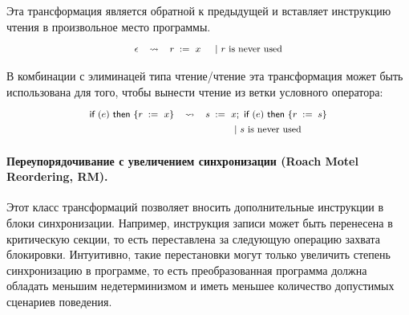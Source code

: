 Эта трансформация является обратной к предыдущей и вставляет инструкцию чтения в произвольное место программы.
%
\[\def\arraystretch{1.4}\footnotesize
  \begin{array}{cccl} 

      \epsInst
    & \leadsto 
    & \readInst{}{r}{x} 
    & ~|~ \text{$r$ is never used}  \\ 

  \end{array}
\]

В комбинации с элиминацей типа чтение/чтение 
эта трансформация может быть использована 
для того, чтобы вынести чтение из 
ветки условного оператора:
%
\[\def\arraystretch{1.4}\footnotesize
  \begin{array}{ccc} 

      \kw{if} (e)~ \kw{then} \{ \readInst{}{r}{x} \}
    & \leadsto 
    & \readInst{}{s}{x} \seq \kw{if} (e)~ \kw{then} \{ \assignInst{r}{s} \} \\
    & & ~|~ \text{$s$ is never used}  \\ 

  \end{array}
\]

\paragraph{
Переупорядочивание с увеличением синхронизации
(Roach Motel Reordering, RM).
}

Этот класс трансформаций позволяет вносить дополнительные инструкции в блоки синхронизации. 
Например, инструкция записи может быть 
перенесена в критическую секции, то есть
переставлена за следующую операцию захвата блокировки. 
Интуитивно, такие перестановки могут 
только увеличить степень синхронизацию в программе, 
то есть преобразованная программа 
должна обладать меньшим недетерминизмом 
и иметь меньшее количество допустимых сценариев поведения. 

